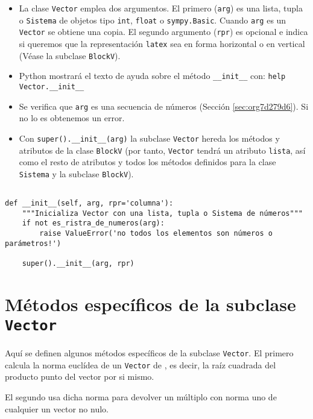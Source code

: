 \documentclass[11pt]{report}
\begin{document}
\begin{itemize}
\item La clase \texttt{Vector} emplea dos argumentos. El primero (\texttt{arg}) es una
lista, tupla o \texttt{Sistema} de objetos tipo \texttt{int}, \texttt{float} o
\texttt{sympy.Basic}. Cuando \texttt{arg} es un \texttt{Vector} se obtiene una copia. El
segundo argumento (\texttt{rpr}) es opcional e indica si queremos que la
representación \texttt{latex} sea en forma horizontal o en vertical (Véase
la subclase \texttt{BlockV}).

\item Python mostrará el texto de ayuda sobre el método \texttt{\_\_init\_\_} con:
\texttt{help Vector.\_\_init\_\_}

\item Se verifica que \texttt{arg} es una secuencia de números (Sección
\ref{sec:org7d279d6}). Si no lo es obtenemos un error.

\item Con \texttt{super().\_\_init\_\_(arg)} la subclase \texttt{Vector} hereda los métodos
y atributos de la clase \texttt{BlockV} (por tanto, \texttt{Vector} tendrá un
atributo \texttt{lista}, así como el resto de atributos y todos los métodos
definidos para la clase \texttt{Sistema} y la subclase \texttt{BlockV}).
\end{itemize}


\begin{verbatim}

def __init__(self, arg, rpr='columna'):
    """Inicializa Vector con una lista, tupla o Sistema de números"""                       
    if not es_ristra_de_numeros(arg):
        raise ValueError('no todos los elementos son números o parámetros!')

    super().__init__(arg, rpr)

\end{verbatim}

\section{Métodos específicos de la subclase \texttt{Vector}}
\label{sec:orgcc934cb}

Aquí se definen algunos métodos específicos de la subclase
\texttt{Vector}. El primero calcula la norma euclídea de un \texttt{Vector} de
\R[n], es decir, la raíz cuadrada del producto punto del vector por si
mismo.

El segundo usa dicha norma para devolver un múltiplo con norma uno de
cualquier un vector no nulo.
\end{document}
